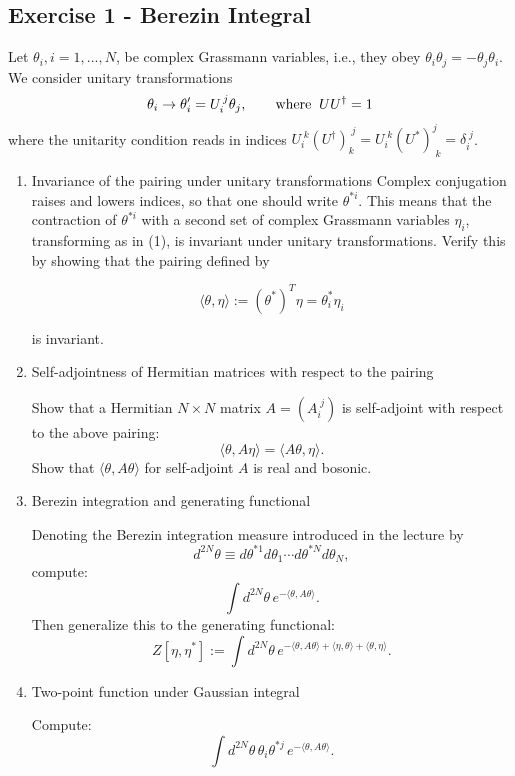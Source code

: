 \documentclass[10pt,a4paper]{article}
\theoremstyle{definition}
\begin{document}
\subsection{Exercise 1 - Berezin Integral}
{\color{blue}
Let $\theta_i, i = 1,...,N$, be complex Grassmann variables, i.e., they obey $\theta_i\theta_j=-\theta_j\theta_i$. We
consider unitary transformations
\begin{align}
\theta_i\rightarrow\theta'_i=U_i^{\,j}\theta_j,\qquad\text{where\;}\;UU^\dagger=1
\end{align}
where the unitarity condition reads in indices $U_i^{\;k}(U^\dagger)_k^{\;j}=U_i^{\;k}(U^*)^j_{\;k}=\delta_i^{\;j}$.

\begin{enumerate}

\item Invariance of the pairing under unitary transformations
Complex conjugation raises and lowers indices, so that one should write $\theta^{*i}$. This means that the contraction of $\theta^{*i}$ with a second set of complex Grassmann variables $\eta_i$, transforming as in (1), is invariant under unitary transformations. Verify this by showing that the pairing defined by

\[
\langle \theta, \eta \rangle := (\theta^*)^T \eta = \theta^*_i \eta_i \tag{2}
\]

is invariant.

\item Self-adjointness of Hermitian matrices with respect to the pairing

Show that a Hermitian $N \times N$ matrix $A = (A_i^{\;j})$ is self-adjoint with respect to the above pairing:
\[
\langle \theta, A \eta \rangle = \langle A \theta, \eta \rangle. \tag{3}
\]
Show that $\langle \theta, A \theta \rangle$ for self-adjoint $A$ is real and bosonic.


\item Berezin integration and generating functional

Denoting the Berezin integration measure introduced in the lecture by
\[
d^{2N}\theta \equiv d\theta^{*1} d\theta_1 \cdots d\theta^{*N} d\theta_N, \tag{4}
\]
compute:
\[
\int d^{2N}\theta\, e^{-\langle \theta, A \theta \rangle}. \tag{5}
\]
Then generalize this to the generating functional:
\[
Z[\eta, \eta^*] := \int d^{2N}\theta\, e^{-\langle \theta, A \theta \rangle + \langle \eta, \theta \rangle + \langle \theta, \eta \rangle}. \tag{6}
\]


\item Two-point function under Gaussian integral

Compute:
\[
\int d^{2N}\theta\, \theta_i \theta^{*j}\, e^{-\langle \theta, A \theta \rangle}. \tag{7}
\]

\end{enumerate}
}
\end{document}
